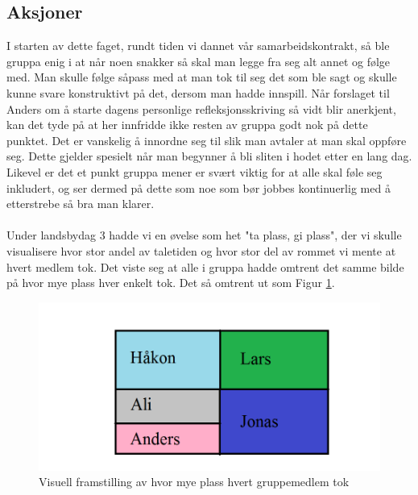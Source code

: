 




\newpage

\subsection{Aksjoner}

I starten av dette faget, rundt tiden vi dannet vår samarbeidskontrakt, så ble gruppa enig i at når noen snakker så skal man legge fra seg alt annet og følge med. Man skulle følge såpass med at man tok til seg det som ble sagt og skulle kunne svare konstruktivt på det, dersom man hadde innspill. Når forslaget til Anders om å starte dagens personlige refleksjonsskriving så vidt blir anerkjent, kan det tyde på at her innfridde ikke resten av gruppa godt nok på dette punktet. Det er vanskelig å innordne seg til slik man avtaler at man skal oppføre seg. Dette gjelder spesielt når man begynner å bli sliten i hodet etter en lang dag. Likevel er det et punkt gruppa mener er svært viktig for at alle skal føle seg inkludert, og ser dermed på dette som noe som bør jobbes kontinuerlig med å etterstrebe så bra man klarer.\\
\\

Under landsbydag 3 hadde vi en øvelse som het "ta plass, gi plass", der vi skulle visualisere hvor stor andel av taletiden og hvor stor del av rommet vi mente at hvert medlem tok. Det viste seg at alle i gruppa hadde omtrent det samme bilde på hvor mye plass hver enkelt tok. Det så omtrent ut som Figur \ref{fig:taplass}.

\begin{figure}[H] 
    \centering
    \includegraphics[scale=0.5]{images/taplass.png}
    \caption{Visuell framstilling av hvor mye plass hvert gruppemedlem tok}
    \label{fig:taplass}
\end{figure}\\


